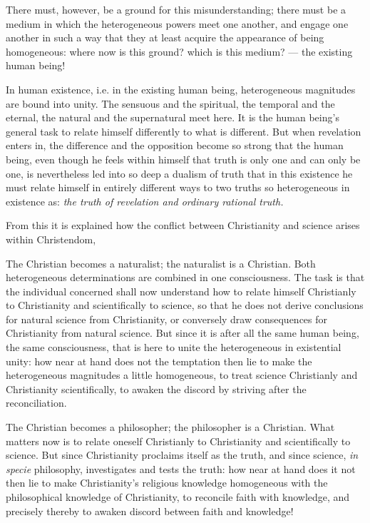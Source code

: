 \documentclass[12pt,a4paper]{book}
\begin{document}
There must, however, be a ground for this misunderstanding; there must be a
medium in which the heterogeneous powers meet one another, and engage one
another in such a way that they at least acquire the appearance of being
homogeneous: where now is this ground? which is this medium? --- the existing
human being!

In human existence, i.e. in the existing human being, heterogeneous magnitudes
are bound into unity. The sensuous and the spiritual, the temporal and the
eternal, the natural and the supernatural meet here. It is the human being's
general task to relate himself differently to what is different. But when
revelation enters in, the difference and the opposition become so strong that
the human being, even though he feels within himself that truth is only one and
can only be one, is nevertheless led into so deep a dualism of truth that in
this existence he must relate himself in entirely different ways to two truths
so heterogeneous in existence as: \emph{the truth of revelation and ordinary
rational truth.}

From this it is explained how the conflict between Christianity and science
arises within Christendom,

The Christian becomes a naturalist; the naturalist is a Christian. Both
heterogeneous determinations are combined in one consciousness. The task is
that the individual concerned shall now understand how to relate himself
Christianly to Christianity and scientifically to science, so that he does not
derive conclusions for natural science from Christianity, or conversely draw
consequences for Christianity from natural science. But since it is after all
the same human being, the same consciousness, that is here to unite the
heterogeneous in existential unity: how near at hand does not the temptation
then lie to make the heterogeneous magnitudes a little homogeneous, to treat
science Christianly and Christianity scientifically, to awaken the discord by
striving after the reconciliation.

The Christian becomes a philosopher; the philosopher is a Christian. What
matters now is to relate oneself Christianly to Christianity and scientifically
to science. But since Christianity proclaims itself as the truth, and since
science, \textit{in specie} philosophy, investigates and tests the truth: how
near at hand does it not then lie to make Christianity's religious knowledge
homogeneous with the philosophical knowledge of Christianity, to reconcile
faith with knowledge, and precisely thereby to awaken discord between faith and
knowledge!
\end{document}
